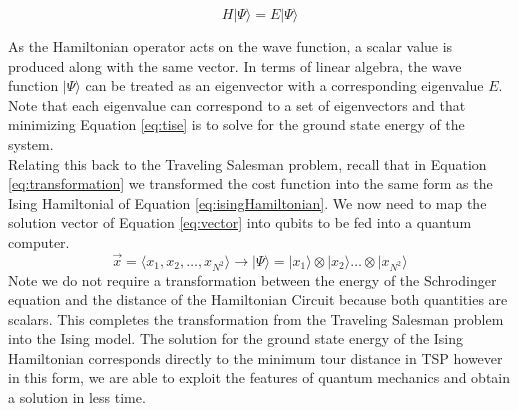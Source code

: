 		\begin{equation}
			H | \Psi \rangle = E | \Psi \rangle
			\label{eq:tise}
		\end{equation}
	
		As the Hamiltonian operator acts on the wave function, a scalar value is produced along with the same vector. 
		In terms of linear algebra, the wave function $| \Psi \rangle$ can be treated as an eigenvector with a corresponding eigenvalue $E$. 
		Note that each eigenvalue can correspond to a set of eigenvectors and that minimizing Equation \ref{eq:tise} is to solve for the ground state energy of the system. \\
		
		Relating this back to the Traveling Salesman problem, recall that in Equation \ref{eq:transformation} we transformed the cost function into the same form as the Ising Hamiltonial of Equation \ref{eq:isingHamiltonian}. We now need to map the solution vector of Equation \ref{eq:vector} into qubits to be fed into a quantum computer. 
		\begin{equation}
			\vec{x} = \langle x_1, x_2, \dots, x_{N^2} \rangle \rightarrow |\Psi\rangle = |x_1\rangle \otimes |x_2\rangle \dots \otimes  |x_{N^2}\rangle 
		\end{equation}
		Note we do not require a transformation between the energy of the Schrodinger equation and the distance of the Hamiltonian Circuit because both quantities are scalars. This completes the transformation from the Traveling Salesman problem into the Ising model. The solution for the ground state energy of the Ising Hamiltonian corresponds directly to the minimum tour distance in TSP however in this form, we are able to exploit the features of quantum mechanics and obtain a solution in less time. 
